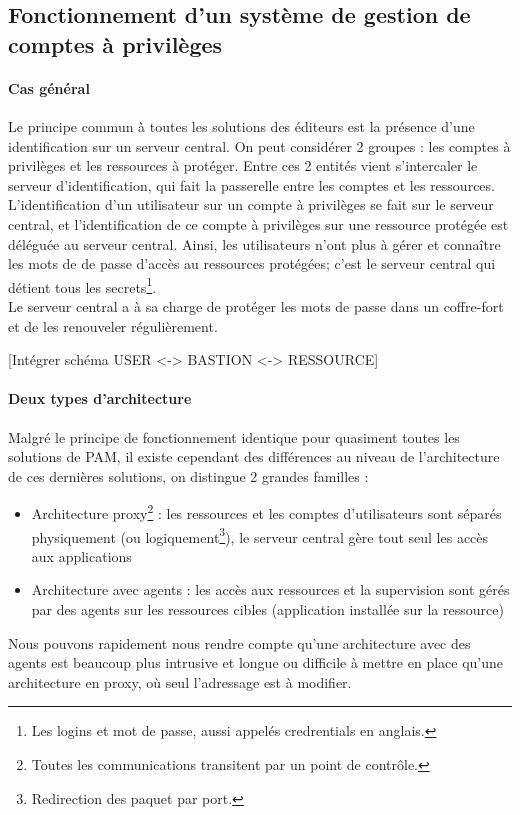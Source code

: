 \subsection{Fonctionnement d'un système de gestion de comptes à privilèges}

\paragraph{Cas général}
Le principe commun à toutes les solutions des éditeurs est la présence d'une identification sur un serveur central. On peut considérer 2 groupes : les comptes à privilèges et les ressources à protéger. Entre ces 2 entités vient s'intercaler le serveur d'identification, qui fait la passerelle entre les comptes et les ressources.\\
L'identification d'un utilisateur sur un compte à privilèges se fait sur le serveur central, et l'identification de ce compte à privilèges sur une ressource protégée est déléguée au serveur central. Ainsi, les utilisateurs n'ont plus à gérer et connaître les mots de de passe d'accès au ressources protégées; c'est le serveur central qui détient tous les secrets\footnote{Les logins et mot de passe, aussi appelés \og credrentials \fg{} en anglais.}.\\
Le serveur central a à sa charge de protéger les mots de passe dans un coffre-fort et de les renouveler régulièrement.

\begin{center}
	[Intégrer schéma USER <-> BASTION <-> RESSOURCE]
\end{center}

\paragraph{Deux types d'architecture}
Malgré le principe de fonctionnement identique pour quasiment toutes les solutions de PAM, il existe cependant des différences au niveau de l'architecture de ces dernières solutions, on distingue 2 grandes familles :
\begin{itemize}
	\item Architecture proxy\footnote{Toutes les communications transitent par un point de contrôle.} : les ressources et les comptes d'utilisateurs sont séparés physiquement (ou logiquement\footnote{Redirection des paquet  par port.}), le serveur central gère tout seul les accès aux applications
	\item Architecture avec agents : les accès aux ressources et la supervision sont gérés par des agents sur les ressources cibles (application installée sur la ressource)
\end{itemize}
Nous pouvons rapidement nous rendre compte qu'une architecture avec des agents est beaucoup plus intrusive et longue ou difficile à mettre en place qu'une architecture en proxy, où seul l'adressage est à modifier.


